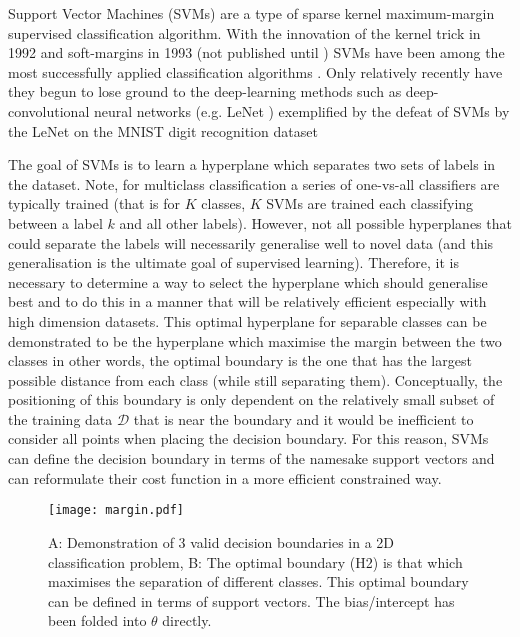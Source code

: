 Support Vector Machines (SVMs) are a type of sparse kernel maximum-margin supervised classification algorithm.
With the innovation of the kernel trick in 1992 \citep{Boser1992} and soft-margins in 1993 (not published until \citep{Cortes1995}) SVMs have been 
among the most successfully applied classification algorithms \citep{Fernandez-Delgado2014}.
Only relatively recently have they begun to lose ground to the deep-learning methods such as deep-convolutional neural networks (e.g. LeNet \citep{LeCunn1998}) exemplified 
by the defeat of SVMs by the LeNet on the MNIST digit recognition dataset \citep{Hinton2006,Bengio2007} \citep{Bengio2013}

The goal of SVMs is to learn a hyperplane which separates two sets of labels in the dataset. Note, for multiclass classification a series of one-vs-all
classifiers are typically trained (that is for \(K\) classes, \(K\) SVMs are trained each classifying between a label \(k\) and all other labels).
However, not all possible hyperplanes that could separate the labels will necessarily generalise well to novel data (and this generalisation
is the ultimate goal of supervised learning).  Therefore, it is necessary to determine a way to select the hyperplane which should generalise best and to do
this in a manner that will be relatively efficient especially with high dimension datasets.  This optimal hyperplane for separable classes can be demonstrated to be
the hyperplane which maximise the margin between the two classes \citep{vapnik1982estimation} in other words, the optimal boundary is the one that has the largest
possible distance from each class (while still separating them).  Conceptually, the positioning of this boundary is only dependent
on the relatively small subset of the training data \(\mathcal{D}\) that is near the boundary and it would be inefficient to consider all points when
placing the decision boundary.  For this reason, SVMs can define the decision boundary in terms of the namesake support vectors and can reformulate
their cost function in a more efficient constrained way.

\begin{figure}[h]
    \texttt{[image: margin.pdf]}
    \caption{A: Demonstration of 3 valid decision boundaries in a 2D classification problem, B: The optimal boundary (H2) is that which maximises
        the separation of different classes.  This optimal boundary can be defined in terms of support vectors.  The bias/intercept has been 
    folded into \(\theta\) directly.}
    \label{fig:margin}
\end{figure}


